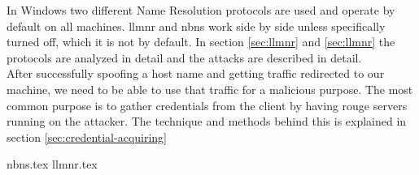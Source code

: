\documentclass{article}
\begin{document}
In Windows two different Name Resolution protocols are used and operate by default on all machines. \gls{llmnr} and \gls{nbns} work side by side unless specifically turned off, which it is not by default. In section \ref{sec:llmnr} and \ref{sec:llmnr} the protocols are analyzed in detail and the attacks are described in detail.
\\
After successfully spoofing a host name and getting traffic redirected to our machine, we need to be able to use that traffic for a malicious purpose. The most common purpose is to gather credentials from the client by having rouge servers running on the attacker. The technique and methods behind this is explained in section \ref{sec:credential-acquiring}

{nbns.tex}
{llmnr.tex}
\end{document}
